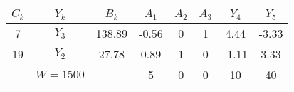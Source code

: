     \begin{tabular}{cccccccc}
    \hline
    \hline
    $C_k$   & $Y_k$   & $B_k$   & $A_1$   & $A_2$   & $A_3$   & $Y_4$   & $Y_5$ \bigstrut\\
    \hline
    7       & $Y_3$   & 138.89  & -0.56   & 0       & 1       & 4.44    & -3.33 \bigstrut[t]\\
    19      & $Y_2$   & 27.78   & 0.89    & 1       & 0       & -1.11   & 3.33 \bigstrut[b]\\
    \hline
            & $W=1500$ &         & 5       & 0       & 0       & 10      & 40 \bigstrut\\
    \hline
    \hline
    \end{tabular}%
